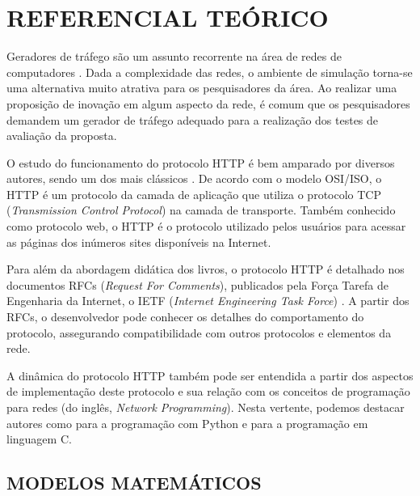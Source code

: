\newpage

\section{REFERENCIAL TEÓRICO}
\label{sec:referencial-teórico}
Geradores de tráfego são um assunto recorrente na área de redes de computadores \cite{Cheng2013}. Dada a complexidade das redes, o ambiente de simulação torna-se uma alternativa muito atrativa para os pesquisadores da área. Ao realizar uma proposição de inovação em algum aspecto da rede, é comum que os pesquisadores demandem um gerador de tráfego adequado para a realização dos testes de avaliação da proposta.

O estudo do funcionamento do protocolo HTTP é bem amparado por diversos autores, sendo um dos mais clássicos \cite{Kurose2013}. De acordo com o modelo OSI/ISO, o HTTP é um protocolo da camada de aplicação que utiliza o protocolo TCP (\textit{Transmission Control Protocol}) na camada de transporte. Também conhecido como protocolo web, o HTTP é o protocolo utilizado pelos usuários para acessar as páginas dos inúmeros sites disponíveis na Internet.

Para além da abordagem didática dos livros, o protocolo HTTP é detalhado nos documentos RFCs (\textit{Request For Comments}), publicados pela Força Tarefa de Engenharia da Internet, o IETF (\textit{Internet Engineering Task Force}) \cite{IETF2014}. A partir dos RFCs, o desenvolvedor pode conhecer os detalhes do comportamento do protocolo, assegurando compatibilidade com outros protocolos e elementos da rede.

A dinâmica do protocolo HTTP também pode ser entendida a partir dos aspectos de implementação deste protocolo e sua relação com os conceitos de programação para redes (do inglês, \textit{Network Programming}). Nesta vertente, podemos destacar autores como \cite{Rhodes2014} para a programação com Python e \cite{Hall2019} para a programação em linguagem C.

\subsection{MODELOS MATEMÁTICOS}

